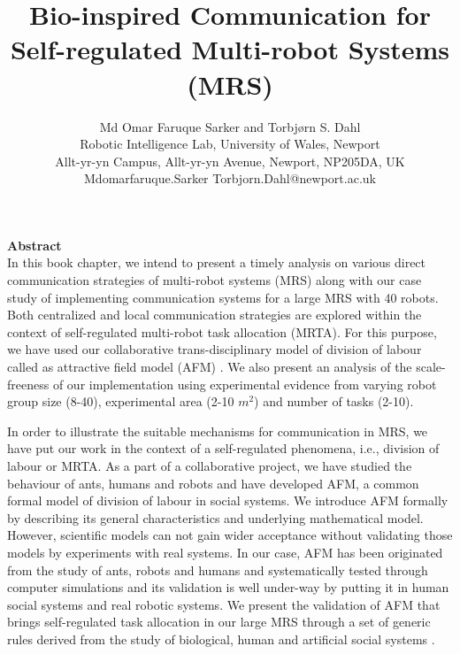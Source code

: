\documentclass[10pt,a4paper]{article}
\author{Md Omar Faruque Sarker and Torbj{\o}rn S. Dahl\\ %
\small
Robotic Intelligence Lab, University of Wales, Newport\\
\small
Allt-yr-yn Campus, Allt-yr-yn Avenue, Newport, NP205DA, UK\\
\small
Mdomarfaruque.Sarker \vline  Torbjorn.Dahl@newport.ac.uk
}
\title{Bio-inspired Communication for Self-regulated Multi-robot Systems (MRS)}
\begin{document}
\maketitle
%
\textbf{\large Abstract}\\

In this book chapter, we intend to present a timely analysis on various direct communication strategies of multi-robot systems (MRS) along with our case study of implementing communication systems for a large MRS with 40 robots. Both centralized and local communication strategies are explored within the context of self-regulated multi-robot task allocation (MRTA). For this purpose, we have used our collaborative trans-disciplinary model of division of labour called as attractive field model (AFM) \cite{Arcaute+2008}. We also present an analysis of the scale-freeness of our implementation using experimental evidence from varying robot group size (8-40), experimental area (2-10 $m^2$) and number of tasks (2-10).
 
In order to illustrate the suitable mechanisms for communication in MRS, we have put our work in the context of a self-regulated phenomena, i.e., division of labour or MRTA. As a part of a collaborative project, we have studied the behaviour of ants, humans and robots and have developed AFM, a common formal model of division of labour in social systems.  We introduce AFM formally by describing its general characteristics and underlying mathematical model. However, scientific models can not gain wider acceptance without validating those models by experiments with real systems. In our case, AFM has been originated from the study of ants, robots and humans and systematically tested through computer simulations and its validation is well under-way by putting it in human social systems and real robotic systems. We present the validation of AFM that brings self-regulated task allocation in our large MRS through a set of generic rules derived from the study of biological, human and artificial social systems \cite{Sarker+2010ants}.
 
\end{document}
